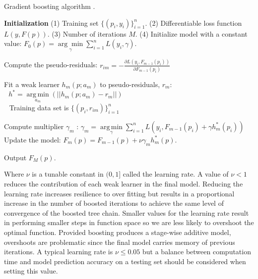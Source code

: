\begin{algorithm}[H]
    \caption{Gradient boosting algorithm \cite{friedman2002}.}
    \begin{algorithmic}[1]
    \STATE \textbf{Initialization} 
    \STATE (1) Training set $\{(p_i, y_i)\}_{i=1}^n$. 
    \STATE (2) Differentiable loss function $L(y, F(p))$. 
    \STATE (3) Number of iterations ${{M}}$.
    \STATE (4)   Initialize model with a constant value:
        $F_0(p) = \underset{\gamma}{\arg\min} \sum_{i=1}^n L(y_i, \gamma).$
    
        \STATE Compute the pseudo-residuals:  
            \STATE $r_{im} = -\frac{\partial L(y_i, F_{m-1}(p_i))}{\partial F_{m-1}(p_i)}$
        \ENDFOR
        
        \STATE Fit a weak learner $h_m(p; a_m)$ to pseudo-residuals, $r_{m}$: \\
            $\ \ \ h^* = \underset{a_m}{\operatorname{arg\,min}}(||h_m(p; a_m) - r_m||)$ \\
            $\ \ $ Training data set is $\{(p_i, r_{im})\}_{i=1}^n$ \;
        
        \STATE Compute multiplier $\gamma_m$ :
        $\gamma_m = \underset{\gamma}{\operatorname{arg\,min}} \sum_{i=1}^n L\left(y_i, F_{m-1}(p_i) + \gamma h^*_m(p_i)\right)$\;
        \STATE Update the model:
        $F_m(p) = F_{m-1}(p) + \nu \gamma_m h^*_m(p).$
    
    \ENDFOR
    \STATE Output $F_M(p).$
    \end{algorithmic}
\label{alg:boosting}
\end{algorithm}

Where $\nu$ is a tunable constant in $(0, 1]$ called the learning rate.  A value of $\nu < 1$ reduces the contribution of each weak learner in the final model.  Reducing the learning rate increases resilience to over fitting but results in a proportional increase in the number of boosted iterations to achieve the same level of convergence of the boosted tree chain.  Smaller values for the learning rate result in performing smaller steps in function space so we are less likely to overshoot the optimal function. Provided boosting produces a stage-wise additive model, overshoots are problematic since the final model carries memory of previous iterations.  A typical learning rate is $\nu\leq 0.05$ but a balance between computation time and model prediction accuracy on a testing set should be considered when setting this value.

